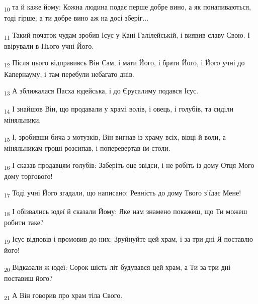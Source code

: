 \begin{tcolorbox}
\textsubscript{10} та й каже йому: Кожна людина подає перше добре вино, а як понапиваються, тоді гірше; а ти добре вино аж на досі зберіг...
\end{tcolorbox}
\begin{tcolorbox}
\textsubscript{11} Такий початок чудам зробив Ісус у Кані Галілейській, і виявив славу Свою. І ввірували в Нього учні Його.
\end{tcolorbox}
\begin{tcolorbox}
\textsubscript{12} Після цього відправивсь Він Сам, і мати Його, і брати Його, і Його учні до Капернауму, і там перебули небагато днів.
\end{tcolorbox}
\begin{tcolorbox}
\textsubscript{13} А зближалася Пасха юдейська, і до Єрусалиму подався Ісус.
\end{tcolorbox}
\begin{tcolorbox}
\textsubscript{14} І знайшов Він, що продавали у храмі волів, і овець, і голубів, та сиділи міняльники.
\end{tcolorbox}
\begin{tcolorbox}
\textsubscript{15} І, зробивши бича з мотузків, Він вигнав із храму всіх, вівці й воли, а міняльникам гроші розсипав, і поперевертав їм столи.
\end{tcolorbox}
\begin{tcolorbox}
\textsubscript{16} І сказав продавцям голубів: Заберіть оце звідси, і не робіть із дому Отця Мого дому торгового!
\end{tcolorbox}
\begin{tcolorbox}
\textsubscript{17} Тоді учні Його згадали, що написано: Ревність до дому Твого з'їдає Мене!
\end{tcolorbox}
\begin{tcolorbox}
\textsubscript{18} І обізвались юдеї й сказали Йому: Яке нам знамено покажеш, що Ти можеш робити таке?
\end{tcolorbox}
\begin{tcolorbox}
\textsubscript{19} Ісус відповів і промовив до них: Зруйнуйте цей храм, і за три дні Я поставлю його!
\end{tcolorbox}
\begin{tcolorbox}
\textsubscript{20} Відказали ж юдеї: Сорок шість літ будувався цей храм, а Ти за три дні поставиш його?
\end{tcolorbox}
\begin{tcolorbox}
\textsubscript{21} А Він говорив про храм тіла Свого.
\end{tcolorbox}
